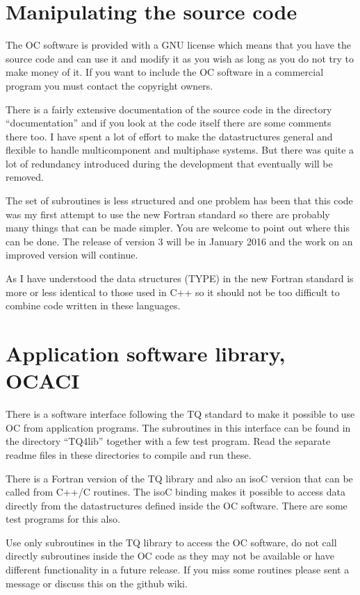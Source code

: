 \documentclass[12pt]{article}
\begin{document}
\section{Manipulating the source code}

The OC software is provided with a GNU license which means that you
have the source code and can use it and modify it as you wish as long
as you do not try to make money of it.  If you want to include the OC
software in a commercial program you must contact the copyright
owners.

There is a fairly extensive documentation of the source code in the
directory ``documentation'' and if you look at the code itself there
are some comments there too.  I have spent a lot of effort to make the
datastructures general and flexible to handle multicomponent and
multiphase systems.  But there was quite a lot of redundancy
introduced during the development that eventually will be removed.

The set of subroutines is less structured and one problem has been
that this code was my first attempt to use the new Fortran standard so
there are probably many things that can be made simpler.  You are
welcome to point out where this can be done.  The release of version 3
will be in January 2016 and the work on an improved version will
continue.

As I have understood the data structures (TYPE) in the new Fortran
standard is more or less identical to those used in C++ so it should
not be too difficult to combine code written in these languages.

\section{Application software library, OCACI}

There is a software interface following the TQ standard to make it
possible to use OC from application programs.  The subroutines in this
interface can be found in the directory ``TQ4lib'' together with a few
test program.  Read the separate readme files in these directories to
compile and run these.

There is a Fortran version of the TQ library and also an isoC version
that can be called from C++/C routines.  The isoC binding makes it
possible to access data directly from the datastructures defined
inside the OC software.  There are some test programs for this also.

Use only subroutines in the TQ library to access the OC software, do
not call directly subroutines inside the OC code as they may not be
available or have different functionality in a future release.  If
you miss some routines please sent a message or discuss this on the
github wiki.
\end{document}
